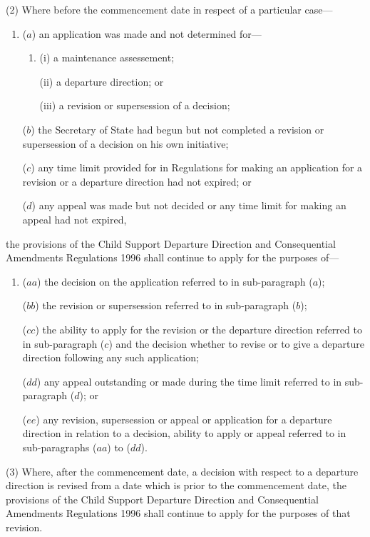 \documentclass[12pt,a4paper]{article}
\begin{document}
(2) Where before the commencement date in respect of a particular case—
\begin{enumerate}\item[]
($a$) an application was made and not determined for—
\begin{enumerate}\item[]
(i) a maintenance assessement;

(ii) a departure direction; or

(iii) a revision or supersession of a decision;
\end{enumerate}

($b$) the Secretary of State had begun but not completed a revision or supersession of a decision on his own initiative;

($c$) any time limit provided for in Regulations for making an application for a revision or a departure direction had not expired; or

($d$) any appeal was made but not decided or any time limit for making an appeal had not expired,
\end{enumerate}
the provisions of the Child Support Departure Direction and Consequential Amendments Regulations 1996 shall continue to apply for the purposes of—
\begin{enumerate}\item[]
($aa$) the decision on the application referred to in sub-paragraph ($a$);

($bb$) the revision or supersession referred to in sub-paragraph ($b$);

($cc$) the ability to apply for the revision or the departure direction referred to in sub-paragraph ($c$)  and the decision whether to revise or to give a departure direction following any such application;

($dd$) any appeal outstanding or made during the time limit referred to in sub-paragraph ($d$); or

\pagebreak[3]

($ee$) any revision, supersession or appeal or application for a departure direction in relation to a decision, ability to apply or appeal referred to in sub-paragraphs ($aa$)  to ($dd$).
\end{enumerate}

(3) Where, after the commencement date, a decision with respect to a departure direction is revised from a date which is prior to the commencement date, the provisions of the Child Support Departure Direction and Consequential Amendments Regulations 1996 shall continue to apply for the purposes of that revision.
\end{document}
